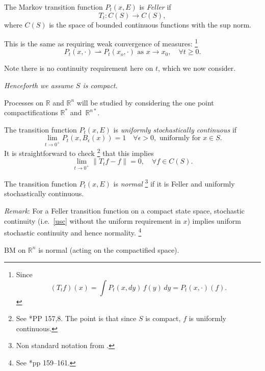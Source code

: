 \documentclass[a4paper]{amsart}
\theoremstyle{plain}
\theoremstyle{definition}
\theoremstyle{remark}
\begin{document}
 The Markov transition function $ P_t(x,E) $ is \emph{Feller} if
  \begin{equation} \label{}
T_t : C(S) \to C(S) ,
\end{equation}
where $ C(S) $ is the space of bounded continuous functions with the sup norm.




This is the same as  requiring weak convergence of measures:%
\footnote{Since 
\[
(T_tf)(x) = \int P_t(x,dy)\, f(y)\, dy = P_t(x,\cdot)(f).
\]}
\begin{equation} \label{} 
P_t(x,\cdot) \rightharpoonup  P_t(x_o,\cdot) \text{ as } x\to x_0, \quad \forall t\geq 0.
\end{equation} 

Note there is no continuity requirement here on $ t $, which we now consider.

\bigskip \emph{Henceforth we assume $ S $ is  compact}.  

Processes on $ \mathbb{R} $ and $ \mathbb{R}^n $ will be studied by considering the one point compactifications $   \mathbb{R}^* $ and~$ \mathbb{R}^{n*} $.

\bigskip The transition function $ P_t(x,E) $ is \emph{uniformly stochastically continuous} if 
\begin{equation} \label{usc} 
\lim_{t\to 0^+} P_t(x, B_\epsilon(x)) = 1 \quad \forall \epsilon >0, \text{ uniformly for } x \in S.
\end{equation} 
It is straightforward to check%
\footnote{See \cite{Lam}*{PP 157,8}. The point is that since $ S $ is compact, $ f $ is uniformly continuous.} 
that this implies 
\begin{equation} \label{} 
\lim_{t\to 0^+}  \| T_t f - f \| = 0, \quad \forall f \in C(S) .
\end{equation} 
  
\bigskip The transition function $ P_t(x,E) $ is  \emph{normal}%
\footnote{Non standard notation from \cite{Lam}.}
if it is Feller and uniformly stochastically continuous. 

\bigskip \emph{Remark}:  For a Feller transition function on a compact state space, stochastic continuity (i.e.\ \eqref{usc} without the uniform requirement in $ x $) implies uniform stochastic continuity and hence normality.%
\footnote{See \cite{Lam}*{pp 159--161}.} 
 
\bigskip BM on $ \mathbb{R}^n$ is normal (acting on the  compactified space).
 
\end{document}
